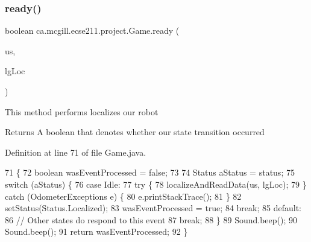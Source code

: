 \subsubsection{\texorpdfstring{ready()}{ready()}}
{\footnotesize\ttfamily boolean ca.\+mcgill.\+ecse211.\+project.\+Game.\+ready (\begin{DoxyParamCaption}\item[{\hyperlink{classca_1_1mcgill_1_1ecse211_1_1localization_1_1_ultrasonic_localizer}{Ultrasonic\+Localizer}}]{us,  }\item[{\hyperlink{classca_1_1mcgill_1_1ecse211_1_1localization_1_1_light_localizer}{Light\+Localizer}}]{lg\+Loc }\end{DoxyParamCaption})}

This method performs localizes our robot

\begin{DoxyReturn}{Returns}
A boolean that denotes whether our state transition occurred 
\end{DoxyReturn}


Definition at line 71 of file Game.\+java.


\begin{DoxyCode}
71                                                                      \{
72     \textcolor{keywordtype}{boolean} wasEventProcessed = \textcolor{keyword}{false};
73 
74     Status aStatus = status;
75     \textcolor{keywordflow}{switch} (aStatus) \{
76       \textcolor{keywordflow}{case} Idle:
77         \textcolor{keywordflow}{try} \{
78           localizeAndReadData(us, lgLoc);
79         \} \textcolor{keywordflow}{catch} (OdometerExceptions e) \{
80           e.printStackTrace();
81         \}
82         setStatus(Status.Localized);
83         wasEventProcessed = \textcolor{keyword}{true};
84         \textcolor{keywordflow}{break};
85       \textcolor{keywordflow}{default}:
86         \textcolor{comment}{// Other states do respond to this event}
87         \textcolor{keywordflow}{break};
88     \}
89     Sound.beep();
90     Sound.beep();
91     \textcolor{keywordflow}{return} wasEventProcessed;
92   \}
\end{DoxyCode}
\mbox{\label{enumca_1_1mcgill_1_1ecse211_1_1project_1_1_game_adf69abe44e952d627fb9e6a2f678cb5e}} 
